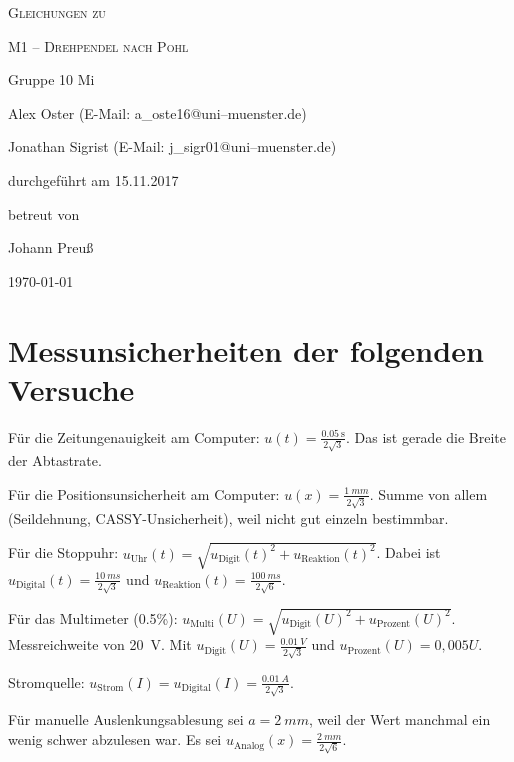 \documentclass[11pt,a4paper,titlepage, ngerman]{article}
\begin{document}
	\begin{titlepage}
		
		\centering
		{\scshape\LARGE Gleichungen zu \par}
		\vspace{1cm}
		{\scshape\huge M1 -- Drehpendel nach Pohl\par}
		\vspace{2.5cm}
		{\LARGE Gruppe 10 Mi\par}
		\vspace{0.5cm}
		{\large Alex Oster (E-Mail: a\_oste16@uni--muenster.de) \par}
		{\large Jonathan Sigrist (E-Mail: j\_sigr01@uni--muenster.de) \par}
		\vfill
		durchgeführt am 15.11.2017\par
		betreut von\par
		{\large Johann Preuß}		
		\vfill	
		{\large \today\par}
		
	\end{titlepage}
		
	\tableofcontents
		
	\newpage
		
	\section{Messunsicherheiten der folgenden Versuche}
		
		Für die Zeitungenauigkeit am Computer: $u(t) = \frac{\SI{0,05}{\second}}{2\sqrt{3}}$.
		Das ist gerade die Breite der Abtastrate.
		
		Für die Positionsunsicherheit am Computer: $u(x) = \frac{\SI{1}{mm}}{2\sqrt{3}}$.
		Summe von allem (Seildehnung, CASSY-Unsicherheit), weil nicht gut einzeln bestimmbar.
		
		Für die Stoppuhr: $u_\text{Uhr}(t) = \sqrt{u_\text{Digit}(t)^2 + u_\text{Reaktion}(t)^2}$.
		Dabei ist $u_\text{Digital}(t) = \frac{\SI{10}{ms}}{2\sqrt{3}}$ und $u_\text{Reaktion}(t) = \frac{\SI{100}{ms}}{2\sqrt{6}}$.
		
		Für das Multimeter (0.5\%): $u_\text{Multi}(U) = \sqrt{u_\text{Digit}(U)^2 + u_\text{Prozent}(U)^2}$.
		Messreichweite von \SI{20}{V}.
		Mit $u_\text{Digit}(U) = \frac{\SI{0,01}{V}}{2\sqrt{3}}$ und $u_\text{Prozent}(U) = 0,005 U$.
		
		Stromquelle: $u_\text{Strom}(I) = u_\text{Digital}(I) = \frac{\SI{0,01}{A}}{2\sqrt{3}}$.
		
		Für manuelle Auslenkungsablesung sei $a = \SI{2}{mm}$, weil der Wert manchmal ein wenig schwer abzulesen war.		
		Es sei $u_\text{Analog}(x) = \frac{\SI{2}{mm}}{2\sqrt{6}}$.
	
\end{document}

